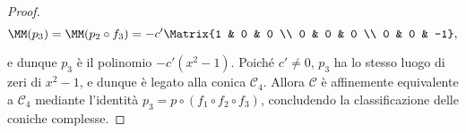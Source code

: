 \documentclass[11pt]{article}
\begin{document}
\begin{proof}
		\[ \MM(p_3) = \MM(p_2 \circ f_3) = -c' \Matrix{1 & 0 & 0 \\ 0 & 0 & 0 \\ 0 & 0 & -1}, \]
		
		\vskip 0.05in
		
		e dunque $p_3$ è il polinomio $-c'(x^2 - 1)$. Poiché
		$c' \neq 0$, $p_3$ ha lo stesso luogo di zeri di
		$x^2 - 1$, e dunque è legato alla conica $\mathcal{C}_4$.
		Allora $\mathcal{C}$ è affinemente equivalente a
		$\mathcal{C}_4$ mediante l'identità $p_3 = p \circ (f_1 \circ f_2 \circ f_3)$, concludendo la classificazione
		delle coniche complesse.
		
	\end{proof}
\end{document}
